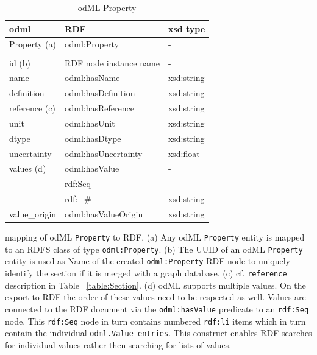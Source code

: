 \documentclass{article}
\begin{document}
\begin{table}
\begin{threeparttable}
\begin{tabular}{lll}
\toprule
    odml            & RDF                           & xsd type \\
\midrule
    Property (a)    & odml:Property                 & - \\
                    & & \\
    id (b)          & RDF node instance name        & - \\
    name            & odml:hasName                  & xsd:string \\
    definition      & odml:hasDefinition            & xsd:string \\
    reference (c)   & odml:hasReference             & xsd:string \\
    unit            & odml:hasUnit                  & xsd:string \\
    dtype           & odml:hasDtype                 & xsd:string \\
    uncertainty     & odml:hasUncertainty           & xsd:float \\
    values (d)      & odml:hasValue                 & - \\
                    & rdf:Seq                       & - \\
                    & rdf:\_\#                      & xsd:string \\
    value\_origin    & odml:hasValueOrigin           & xsd:string \\
\bottomrule
\end{tabular}
\caption{odML Property}
\begin{tablenotes}
\item mapping of odML \texttt{Property} to RDF. (a) Any odML \texttt{Property} entity is mapped to an RDFS class of type \texttt{odml:Property}. (b) The UUID of an odML \texttt{Property} entity is used as Name of the created \texttt{odml:Property} RDF node to uniquely identify the section if it is merged with a graph database. (c) cf. \texttt{reference} description in Table ~\ref{table:Section}. (d) odML supports multiple values. On the export to RDF the order of these values need to be respected as well. Values are connected to the RDF document via the \texttt{odml:hasValue} predicate to an \texttt{rdf:Seq} node. This \texttt{rdf:Seq} node in turn contains numbered \texttt{rdf:li} items which in turn contain the individual \texttt{odml.Value entries}. This construct enables RDF searches for individual values rather then searching for lists of values.
\end{tablenotes}
\label{table:Property}
\end{threeparttable}
\end{table}
\end{document}
